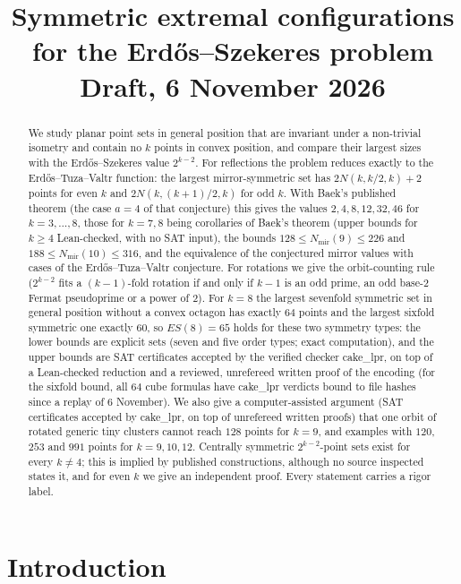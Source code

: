\documentclass[10pt]{article}
\title{Symmetric extremal configurations for the Erd\H{o}s--Szekeres problem\\[3pt]\large Draft, 6 November 2026}
\author{}
\date{}
\theoremstyle{definition}
\theoremstyle{remark}
\newcommand{\Nm}{N_{\mathrm{mir}}}
\begin{document}
\maketitle

\begin{abstract}
We study planar point sets in general position that are invariant under a non-trivial isometry and contain no $k$
points in convex position, and compare their largest sizes with the Erd\H{o}s--Szekeres value $2^{k-2}$. For reflections
the problem reduces exactly to the Erd\H{o}s--Tuza--Valtr function: the largest mirror-symmetric set has $2N(k,k/2,k)+2$
points for even $k$ and $2N(k,(k+1)/2,k)$ for odd $k$. With Baek's published theorem (the case $a=4$ of that
conjecture) this gives the values $2,4,8,12,32,46$ for $k=3,\dots,8$, those for $k=7,8$ being corollaries of Baek's
theorem (upper bounds for $k\ge4$ Lean-checked, with no SAT input), the bounds $128\le\Nm(9)\le226$ and $188\le\Nm(10)\le316$,
and the equivalence of the conjectured mirror values with cases of the Erd\H{o}s--Tuza--Valtr conjecture. For rotations
we give the orbit-counting rule ($2^{k-2}$ fits a $(k-1)$-fold rotation if and only if $k-1$ is an odd prime, an odd
base-$2$ Fermat pseudoprime or a power of $2$). For $k=8$ the largest sevenfold symmetric set in general position
without a convex octagon has exactly $64$ points and the largest sixfold symmetric one exactly $60$, so $ES(8)=65$ holds
for these two symmetry types: the lower bounds are explicit sets (seven and five order types; exact computation), and the
upper bounds are SAT certificates accepted by the verified checker cake\_lpr, on top of a Lean-checked reduction and a
reviewed, unrefereed written proof of the encoding (for the sixfold bound, all $64$ cube formulas have cake\_lpr
verdicts bound to file hashes since a replay of 6 November). We also give a computer-assisted argument (SAT certificates accepted by cake\_lpr, on top of
unrefereed written proofs) that one orbit of rotated generic tiny clusters cannot reach $128$ points for $k=9$, and
examples with $120$, $253$ and $991$ points for $k=9,10,12$. Centrally symmetric $2^{k-2}$-point sets exist for every
$k\ne4$; this is implied by published constructions, although no source inspected states it, and for even $k$ we give an
independent proof. Every statement carries a rigor label.
\end{abstract}

\section{Introduction}\label{sec:intro}
\end{document}
